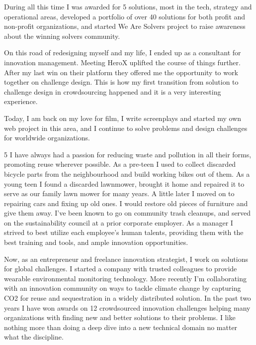\documentclass[12pt, titlepage]{article}
\begin{document}
During all this time I was awarded for 5 solutions, most in the tech,
strategy and operational areas, developed a portfolio of over 40
solutions for both profit and non-profit organizations, and started We
Are Solvers project to raise awareness about the winning solvers
community.

On this road of redesigning myself and my life, I ended up as a
consultant for innovation management. Meeting HeroX uplifted the course
of things further. After my last win on their platform they offered me
the opportunity to work together on challenge design. This is how my
first transition from solution to challenge design in crowdsourcing
happened and it is a very interesting experience.

Today, I am back on my love for film, I write screenplays and started my
own web project in this area, and I continue to solve problems and
design challenges for worldwide organizations.

5 I have always had a passion for reducing waste and pollution in all
their forms, promoting reuse wherever possible. As a pre-teen I used to
collect discarded bicycle parts from the neighbourhood and build working
bikes out of them. As a young teen I found a discarded lawnmower,
brought it home and repaired it to serve as our family lawn mower for
many years. A little later I moved on to repairing cars and fixing up
old ones. I would restore old pieces of furniture and give them away.
I've been known to go on community trash cleanups, and served on the
sustainability council at a prior corporate employer. As a manager I
strived to best utilize each employee's human talents, providing them
with the best training and tools, and ample innovation opportunities.

Now, as an entrepreneur and freelance innovation strategist, I work on
solutions for global challenges. I started a company with trusted
colleagues to provide wearable environmental monitoring technology. More
recently I'm collaborating with an innovation community on ways to
tackle climate change by capturing CO2 for reuse and sequestration in a
widely distributed solution. In the past two years I have won awards on
12 crowdsourced innovation challenges helping many organizations with
finding new and better solutions to their problems. I like nothing more
than doing a deep dive into a new technical domain no matter what the
discipline.
\end{document}
